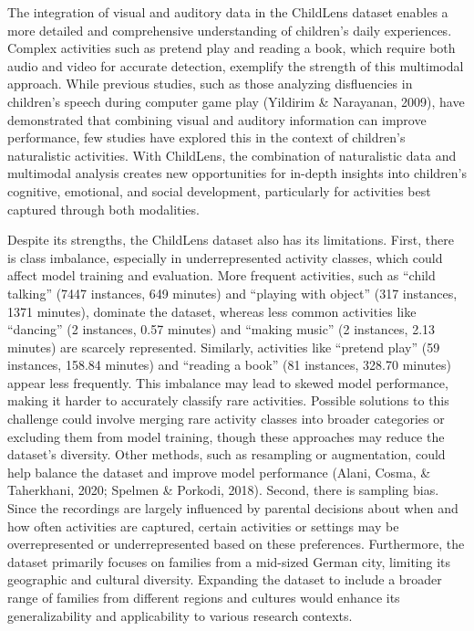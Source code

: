 \documentclass[
  man,floatsintext]{apa6}
\begin{document}
The integration of visual and auditory data in the ChildLens dataset enables a more detailed and comprehensive understanding of children's daily experiences. Complex activities such as pretend play and reading a book, which require both audio and video for accurate detection, exemplify the strength of this multimodal approach. While previous studies, such as those analyzing disfluencies in children's speech during computer game play (Yildirim \& Narayanan, 2009), have demonstrated that combining visual and auditory information can improve performance, few studies have explored this in the context of children's naturalistic activities. With ChildLens, the combination of naturalistic data and multimodal analysis creates new opportunities for in-depth insights into children's cognitive, emotional, and social development, particularly for activities best captured through both modalities.

Despite its strengths, the ChildLens dataset also has its limitations. First, there is class imbalance, especially in underrepresented activity classes, which could affect model training and evaluation. More frequent activities, such as ``child talking'' (7447 instances, 649 minutes) and ``playing with object'' (317 instances, 1371 minutes), dominate the dataset, whereas less common activities like ``dancing'' (2 instances, 0.57 minutes) and ``making music'' (2 instances, 2.13 minutes) are scarcely represented. Similarly, activities like ``pretend play'' (59 instances, 158.84 minutes) and ``reading a book'' (81 instances, 328.70 minutes) appear less frequently. This imbalance may lead to skewed model performance, making it harder to accurately classify rare activities. Possible solutions to this challenge could involve merging rare activity classes into broader categories or excluding them from model training, though these approaches may reduce the dataset's diversity. Other methods, such as resampling or augmentation, could help balance the dataset and improve model performance (Alani, Cosma, \& Taherkhani, 2020; Spelmen \& Porkodi, 2018). Second, there is sampling bias. Since the recordings are largely influenced by parental decisions about when and how often activities are captured, certain activities or settings may be overrepresented or underrepresented based on these preferences. Furthermore, the dataset primarily focuses on families from a mid-sized German city, limiting its geographic and cultural diversity. Expanding the dataset to include a broader range of families from different regions and cultures would enhance its generalizability and applicability to various research contexts.
\end{document}
